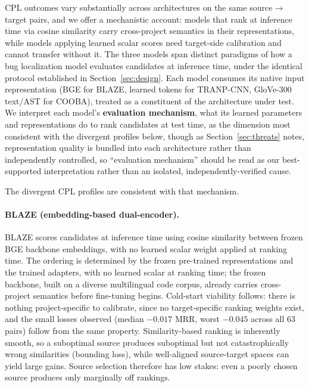 \documentclass[a4paper,fleqn]{cas-dc}
\begin{document}
CPL outcomes vary substantially across architectures on the same
source$\to$target pairs, and we offer a mechanistic account: models that
rank at inference time via cosine similarity carry cross-project semantics
in their representations, while models applying learned scalar scores need
target-side calibration and cannot transfer without it. The three models
span distinct paradigms of how a bug localization model evaluates
candidates at inference time, under the identical protocol established in
Section~\ref{sec:design}. Each model consumes its
native input representation (BGE for BLAZE, learned tokens for TRANP-CNN,
GloVe-300 text/AST for COOBA), treated as a constituent of the architecture
under test. We interpret each model's \textbf{evaluation mechanism}, what
its learned parameters and representations do to rank candidates at test
time, as the dimension most consistent with the divergent profiles below,
though as Section~\ref{sec:threats} notes, representation quality is bundled into
each architecture rather than independently controlled, so ``evaluation
mechanism'' should be read as our best-supported interpretation rather than
an isolated, independently-verified cause.

 The divergent CPL profiles are consistent with that mechanism.

\paragraph{BLAZE (embedding-based dual-encoder).}
BLAZE scores candidates at inference time using cosine similarity between
frozen BGE backbone embeddings, with no learned scalar weight applied at
ranking time. The ordering is determined by the frozen pre-trained
representations and the trained adapters, with no learned scalar at
ranking time; the frozen backbone, built on a diverse multilingual code
corpus, already carries cross-project semantics before fine-tuning begins. Cold-start
viability follows: there is nothing project-specific to calibrate, since no
target-specific ranking weights exist, and the small losses observed
(median $-0.017$ MRR, worst $-0.045$ across all 63 pairs) follow from the same property.
Similarity-based ranking is inherently smooth, so a suboptimal source
produces suboptimal but not catastrophically wrong similarities (bounding
loss), while well-aligned source-target spaces can yield large gains.
Source selection therefore has low stakes: even a poorly chosen source
produces only marginally off rankings.
\end{document}
